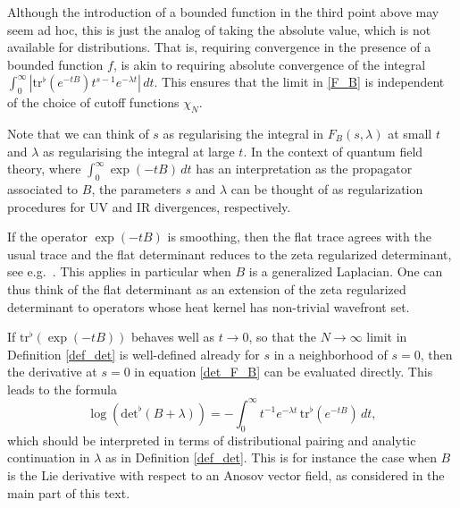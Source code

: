 \documentclass[reqno]{amsart}
\theoremstyle{definition}
\theoremstyle{remark}
\newcommand{\tr}{\mathrm{tr}^\flat}
\renewcommand{\det}{\mathrm{det}^\flat}
\begin{document}
\begin{rmk}
Although the introduction of a bounded function in the third point above may seem ad hoc, this is just the analog of taking the absolute value, which is not available for distributions. That is, requiring convergence in the presence of a bounded function $f$, is akin to requiring absolute convergence of the integral $\int_0^\infty |\tr(e^{-tB})t^{s-1}e^{-\lambda t}|\,dt$. This ensures that the limit in \eqref{F_B} is independent of the choice of cutoff functions $\chi_N$.
\end{rmk}

\begin{rmk}
Note that we can think of $s$ as regularising the integral in $F_B(s,\lambda)$ at small $t$ and $\lambda$ as regularising the integral at large $t$. In the context of quantum field theory, where $\int_0^\infty\exp(-tB)\,dt$ has an interpretation as the propagator associated to $B$, the parameters $s$ and $\lambda$ can be thought of as regularization procedures for UV and IR divergences, respectively.
\end{rmk}


\begin{rmk}
If the operator $\exp(-tB)$ is smoothing, then the flat trace agrees with the usual trace and the flat determinant reduces to the zeta regularized determinant, see e.g.\ \cite[Proposition 6.8]{baladi}. This applies in particular when $B$ is a generalized Laplacian. One can thus think of the flat determinant as an extension of the zeta regularized determinant to operators whose heat kernel has non-trivial wavefront set.
\end{rmk}


\begin{rmk}
If $\tr(\exp(-tB))$ behaves well as $t\to 0$, so that the $N\to \infty$ limit in Definition \ref{def_det} is well-defined already for $s$ in a neighborhood of $s=0$, then the derivative at $s=0$ in equation \eqref{det_F_B} can be evaluated directly. This leads to the formula
\begin{equation*}
\log(\det(B+\lambda)) = -\int_0^\infty t^{-1}e^{-\lambda t}\,\tr(e^{-tB}) \, dt,
\end{equation*}
which should be interpreted in terms of distributional pairing and analytic continuation in $\lambda$ as in Definition \ref{def_det}. This is for instance the case when $B$ is the Lie derivative with respect to an Anosov vector field, as considered in the main part of this text.
\end{rmk}
\end{document}
